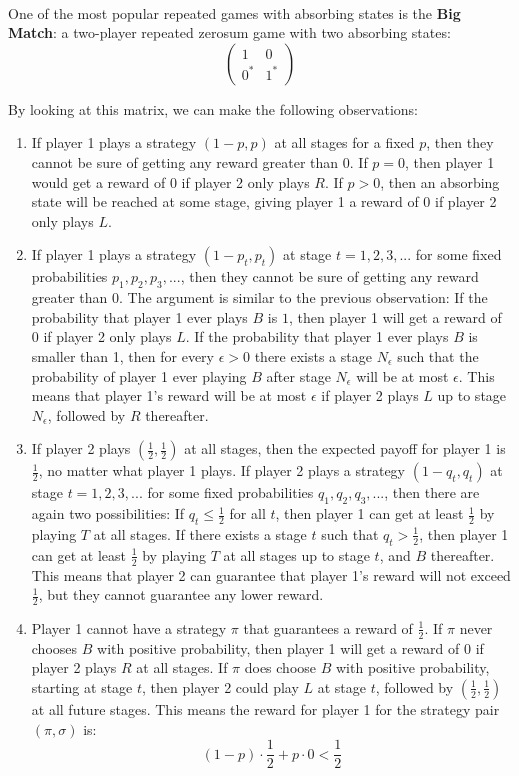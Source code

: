 \documentclass[12pt]{article}
\begin{document}
\noindent
\\
One of the most popular repeated games with absorbing states is the \textbf{Big Match}: a two-player repeated zerosum game with two absorbing states:
\[ \begin{pmatrix}
    1 & 0 \\
    0^\ast & 1^\ast
\end{pmatrix} \]

\noindent
By looking at this matrix, we can make the following observations:

\begin{enumerate}
    \item If player 1 plays a strategy $(1 - p, p)$ at all stages for a fixed $p$, then they cannot be sure of getting any reward greater than $0$. If $p = 0$, then player 1 would get a reward of $0$ if player 2 only plays $R$. If $p > 0$, then an absorbing state will be reached at some stage, giving player 1 a reward of $0$ if player 2 only plays $L$.
    \item If player 1 plays a strategy $(1 - p_t, p_t)$ at stage $t = 1, 2, 3, ...$ for some fixed probabilities $p_1, p_2, p_3, ...$, then they cannot be sure of getting any reward greater than $0$. The argument is similar to the previous observation: If the probability that player 1 ever plays $B$ is $1$, then player 1 will get a reward of $0$ if player 2 only plays $L$. If the probability that player 1 ever plays $B$ is smaller than 1, then for every $\epsilon > 0$ there exists a stage $N_\epsilon$ such that the probability of player 1 ever playing $B$ after stage $N_\epsilon$ will be at most $\epsilon$. This means that player 1's reward will be at most $\epsilon$ if player 2 plays $L$ up to stage $N_\epsilon$, followed by $R$ thereafter.
    \item If player 2 plays $\left( \frac{1}{2}, \frac{1}{2} \right)$ at all stages, then the expected payoff for player 1 is $\frac{1}{2}$, no matter what player 1 plays. If player 2 plays a strategy $(1 - q_t, q_t)$ at stage $t = 1, 2, 3, ...$ for some fixed probabilities $q_1, q_2, q_3, ...$, then there are again two possibilities: If $q_t \leq \frac{1}{2}$ for all $t$, then player 1 can get at least $\frac{1}{2}$ by playing $T$ at all stages. If there exists a stage $t$ such that $q_t > \frac{1}{2}$, then player 1 can get at least $\frac{1}{2}$ by playing $T$ at all stages up to stage $t$, and $B$ thereafter. This means that player 2 can guarantee that player 1's reward will not exceed $\frac{1}{2}$, but they cannot guarantee any lower reward.
    \item Player 1 cannot have a strategy $\pi$ that guarantees a reward of $\frac{1}{2}$. If $\pi$ never chooses $B$ with positive probability, then player 1 will get a reward of $0$ if player 2 plays $R$ at all stages. If $\pi$ does choose $B$ with positive probability, starting at stage $t$, then player 2 could play $L$ at stage $t$, followed by $\left( \frac{1}{2}, \frac{1}{2} \right)$ at all future stages. This means the reward for player 1 for the strategy pair $(\pi, \sigma)$ is:
    \[ (1 - p) \cdot \frac{1}{2} + p \cdot 0 < \frac{1}{2} \]
\end{enumerate}
\end{document}

